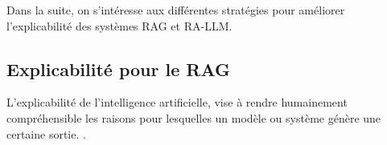        Dans la suite, on s'intéresse aux différentes stratégies pour améliorer l'explicabilité des systèmes RAG et RA-LLM. 


    \subsection{Explicabilité pour le RAG}


        L'explicabilité de l'intelligence artificielle, vise à rendre humainement compréhensible les raisons pour lesquelles un modèle ou système génère une certaine sortie. \cite{garouani_investigating_2024,bell_its_2022}. 
        




